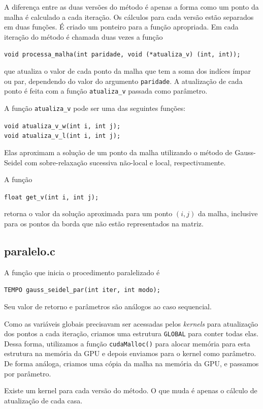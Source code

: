 \documentclass[a4paper,landscape,11pt]{article}
\begin{document}
A diferença entre as duas versões do método é apenas a forma como um ponto da malha é calculado a cada iteração. Os cálculos para cada versão estão separados em duas funções. É criado um ponteiro para a função apropriada. Em cada iteração do método é chamada duas vezes a função

\texttt{void processa\_malha(int paridade, void (*atualiza\_v) (int, int));}

que atualiza o valor de cada ponto da malha que tem a soma dos indíces ímpar ou par, dependendo do valor do argumento \texttt{paridade}. A atualização de cada ponto é feita com a função \texttt{atualiza\_v} passada como parâmetro.

A função \texttt{atualiza\_v} pode ser uma das seguintes funções:

\texttt{void atualiza\_v\_w(int i, int j); \\
void atualiza\_v\_l(int i, int j);}

Elas aproximam a solução de um ponto da malha utilizando o método de Gauss-Seidel com sobre-relaxação sucessiva não-local e local, respectivamente.

A função

\texttt{float get\_v(int i, int j);}

retorna o valor da solução aproximada para um ponto $(i,j)$ da malha, inclusive para os pontos da borda que não estão representados na matriz.

\subsection{paralelo.c}

A função que inicia o procedimento paralelizado é

\texttt{TEMPO gauss\_seidel\_par(int iter, int modo);}

Seu valor de retorno e parâmetros são análogos ao caso sequencial.

Como as variáveis globais precisavam ser acessadas pelos \textit{kernels} para atualização dos pontos a cada iteração, criamos uma estrutura \texttt{GLOBAL} para conter todas elas. Dessa forma, utilizamos a função \texttt{cudaMalloc()} para alocar memória para esta estrutura na memória da GPU e depois enviamos para o kernel como parâmetro. De forma análoga, criamos uma cópia da malha na memória da GPU, e passamos por parâmetro.

Existe um kernel para cada versão do método. O que muda é apenas o cálculo de atualização de cada casa.
\end{document}
